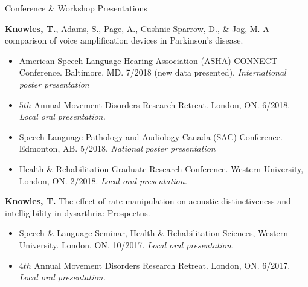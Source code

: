 \documentclass{resume} %
\begin{document}
\begin{rSection}{Conference \& Workshop Presentations}
	
	{\bf Knowles, T.}, Adams, S., Page, A., Cushnie-Sparrow, D., \& Jog, M. A comparison of voice amplification devices in Parkinson's disease. 
		\begin{itemize}
			\renewcommand\labelitemi{$\cdot$}
			\item American Speech-Language-Hearing Association (ASHA) CONNECT Conference. Baltimore, MD. 7/2018 (new data presented). \emph{International poster presentation}
			\item $5th$ Annual Movement Disorders Research Retreat. London, ON. 6/2018. \emph{Local oral presentation.}
			\item Speech-Language Pathology and Audiology Canada (SAC) Conference. Edmonton, AB. 5/2018. \emph{National poster presentation}
			\item Health \& Rehabilitation  Graduate Research Conference. Western University, London, ON. 2/2018. \emph{Local oral presentation.}
		\end{itemize}
	

	
	
	{\bf Knowles, T.} The effect of rate manipulation on acoustic distinctiveness and intelligibility in dysarthria: Prospectus. 
	\begin{itemize}
		\renewcommand\labelitemi{$\cdot$}
		\item Speech \& Language Seminar, Health \& Rehabilitation Sciences, Western University. London, ON. 10/2017. \emph{Local oral presentation.}
		\item $4th$ Annual Movement Disorders Research Retreat. London, ON. 6/2017. \emph{Local oral presentation.}
	\end{itemize}
	

\end{rSection}
\end{document}
